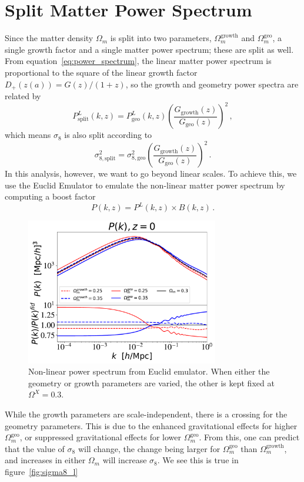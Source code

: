 \section{Split Matter Power Spectrum}
Since the matter density $\Omega_m$ is split into two parameters, $\Omega_m^{\text{growth}}$ and $\Omega_m^{\text{geo}}$, a single growth factor and a single matter power spectrum; these are split as well. From equation~\ref{eq:power_spectrum}, the linear matter power spectrum is proportional to the square of the linear growth factor $D_+(z(a)) = G(z)/(1+z)$, so the growth and geometry power spectra are related by
\begin{equation}
	P^L_{\text{split}}(k,z) = P^L_{\text{geo}}(k,z) \left(\frac{G_{\text{growth}}(z)}{G_{\text{geo}}(z)}\right)^2\,,
\end{equation}
which means $\sigma_8$ is also split according to
\begin{equation}
	\sigma_{8,\text{split}}^2 = \sigma_{8,\text{geo}}^2 \left(\frac{G_{\text{growth}}(z)}{G_{\text{geo}}(z)}\right)^2\,.
\end{equation}
In this analysis, however, we want to go beyond linear scales. To achieve this, we use the Euclid Emulator to emulate the non-linear matter power spectrum by computing a boost factor
\begin{equation}
	P(k,z) = P^L(k,z) \times B(k,z)\,.
\end{equation}
\begin{figure}[ht]
	\centering
	\includegraphics[width=0.75\textwidth]{plots/Pk.pdf}
	\caption{Non-linear power spectrum from Euclid emulator. When either the geometry or growth parameters are varied, the other is kept fixed at $\Omega^X=0.3$.}
	\label{fig:pk}
\end{figure}
While the growth parameters are scale-independent, there is a crossing for the geometry parameters. This is due to the enhanced gravitational effects for higher $\Omega_m^{\mathrm{geo}}$, or suppressed gravitational effects for lower $\Omega_m^\mathrm{geo}$. From this, one can predict that the value of $\sigma_8$ will change, the change being larger for $\Omega_m^\mathrm{geo}$ than $\Omega_m^\mathrm{growth}$, and increases in either $\Omega_m$ will increase $\sigma_8$. We see this is true in figure~\ref{fig:sigma8_l}

